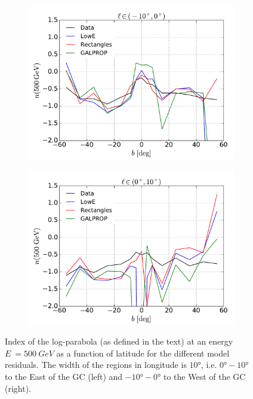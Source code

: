 \begin{figure}[h!]
    \begin{subfigure}{0.5\textwidth}
        \includegraphics[width=\textwidth]{plots/LogParabola_n(500GeV)_l_in_(-10,0).pdf}
    \end{subfigure} 
    \begin{subfigure}{0.5\textwidth}
        \includegraphics[width=\textwidth]{plots/LogParabola_n(500GeV)_l_in_(0,10).pdf}
    \end{subfigure}
  	\caption{Index of the log-parabola (as defined in the text) at an energy $E\ = \SI{500}{GeV}$ as a function of latitude for the different model residuals. The width of the regions in longitude is $\ang{10}$, i.e. $\ang{0} - \ang{10}$ to the East of the GC (left) and $\ang{-10} - \ang{0}$ to the West of the GC (right).}
  	\label{fig:logpar_index}
\end{figure}




